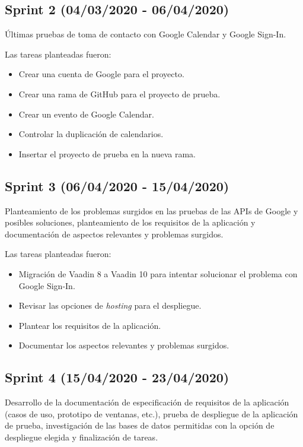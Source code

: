 \subsection{Sprint 2 (04/03/2020 - 06/04/2020)}
Últimas pruebas de toma de contacto con Google Calendar y Google Sign-In.

Las tareas planteadas fueron:
\begin{itemize}
\tightlist
    \item Crear una cuenta de Google para el proyecto.
    \item Crear una rama de GitHub para el proyecto de prueba.
    \item Crear un evento de Google Calendar.
    \item Controlar la duplicación de calendarios.
    \item Insertar el proyecto de prueba en la nueva rama.
\end{itemize}

\subsection{Sprint 3 (06/04/2020 - 15/04/2020)}
Planteamiento de los problemas surgidos en las pruebas de las APIs de Google y posibles soluciones, planteamiento de los requisitos de la aplicación y documentación de aspectos relevantes y problemas surgidos.

Las tareas planteadas fueron:
\begin{itemize}
\tightlist
    \item Migración de Vaadin 8 a Vaadin 10 para intentar solucionar el problema con Google Sign-In.
    \item Revisar las opciones de \textit{hosting} para el despliegue.
    \item Plantear los requisitos de la aplicación.
    \item Documentar los aspectos relevantes y problemas surgidos.
\end{itemize}

\subsection{Sprint 4 (15/04/2020 - 23/04/2020)}
Desarrollo de la documentación de especificación de requisitos de la aplicación (casos de uso, prototipo de ventanas, etc.), prueba de despliegue de la aplicación de prueba, investigación de las bases de datos permitidas con la opción de despliegue elegida y finalización de tareas. 

